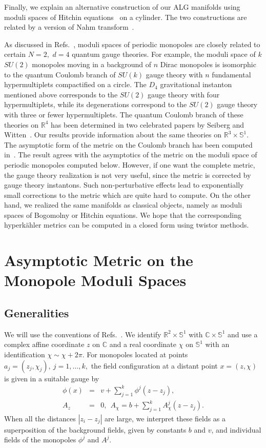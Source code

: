 \documentclass[a4paper,12pt, amsfonts, amssymb]{article}
\newcommand{\CC}{{\mathbb C}}
\newcommand{\RR}{{\mathbb R}}
\renewcommand{\SS}{{\mathbb S}}
\begin{document}
Finally, we explain an alternative construction of our ALG manifolds
using moduli spaces of Hitchin equations~\cite{HitchinSpec} on a cylinder.
The two constructions are related by a version of Nahm transform~\cite{usone,ustwo}.

As discussed in Refs.~\cite{usone,ustwo}, moduli spaces of
periodic monopoles are closely related to certain $N=2,$ $d=4$
quantum gauge theories. For example, the moduli space of $k$
$SU(2)$ monopoles moving in a background of $n$ Dirac monopoles
is isomorphic to the quantum Coulomb branch of $SU(k)$ gauge
theory with $n$ fundamental hypermultiplets compactified on a
circle. The $D_4$ gravitational instanton mentioned above
corresponds to the $SU(2)$ gauge theory with four
hypermultiplets, while its degenerations correspond to the
$SU(2)$ gauge theory with three or fewer hypermultiplets. The
quantum Coulomb branch of these theories on $\RR^4$ has been
determined in two celebrated papers by Seiberg and
Witten~\cite{SW1,SW2}. Our results provide information about the
same theories on $\RR^3\times\SS^1$. The asymptotic form of the
metric on the Coulomb branch has been computed in~\cite{SW3, JWKV, WKV}.
The result agrees with the asymptotics of the metric
on the moduli space of periodic monopoles computed below.
However, if one want the complete metric, the gauge theory realization
is not very useful, since the metric is corrected by gauge theory
instantons. Such non-perturbative effects lead to exponentially small
corrections to the metric which are quite hard to compute.
On the other hand, we realized the same manifolds as classical objects,
namely as moduli spaces  of Bogomolny or Hitchin equations.
We hope that the corresponding hyperk\"ahler metrics can be
computed in a closed form using twistor methods.


\section{Asymptotic Metric on the Monopole Moduli Spaces}
\subsection{Generalities}
We will use the conventions of Refs.~\cite{usone,ustwo}.
We identify $\RR^2\times \SS^1$ with $\CC\times \SS^1$ and use a complex affine coordinate
$z$ on $\CC$
and a real coordinate $\chi$ on $\SS^1$ with an identification
$\chi\sim \chi +2\pi.$
For monopoles located at points $a_j=(z_j,\chi_j),\ j=1,\ldots,k,$
the field configuration at a distant point $x=(z,\chi)$ is given in a
suitable gauge by
\begin{eqnarray}\label{first}
\phi(x)&=&v+\sum_{j=1}^k \phi^j(z-z_j),\\
A_z&=&0,\ \ A_{\chi}=b+\sum_{j=1}^k A^j_{\chi}(z-z_j).
\end{eqnarray}
When all the distances $|z_i-z_j|$ are large, we interpret these fields as a superposition of the background fields, given by constants
$b$ and $v$, and individual fields of the monopoles $\phi^j$ and $A^j$.
\end{document}
